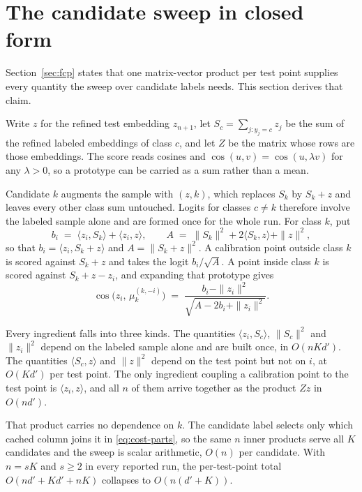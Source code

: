 \section{The candidate sweep in closed form}
\label{app:cost}

Section~\ref{sec:fcp} states that one matrix-vector product per test
point supplies every quantity the sweep over candidate labels needs.
This section derives that claim.

Write $z$ for the refined test embedding $z_{n+1}$, let
$S_c = \sum_{j : y_j = c} z_j$ be the sum of the refined labeled
embeddings of class $c$, and let $Z$ be the matrix whose rows are those
embeddings. The score reads cosines and
$\cos(u, v) = \cos(u, \lambda v)$ for any $\lambda > 0$, so a prototype
can be carried as a sum rather than a mean.

Candidate $k$ augments the sample with $(z, k)$, which replaces $S_k$ by
$S_k + z$ and leaves every other class sum untouched. Logits for classes
$c \neq k$ therefore involve the labeled sample alone and are formed
once for the whole run. For class $k$, put
\begin{equation}
\label{eq:cost-parts}
b_i \;=\; \langle z_i, S_k\rangle + \langle z_i, z\rangle ,
\qquad
A \;=\; \|S_k\|^{2} + 2\langle S_k, z\rangle + \|z\|^{2} ,
\end{equation}
so that $b_i = \langle z_i, S_k + z\rangle$ and $A = \|S_k + z\|^{2}$.
A calibration point outside class $k$ is scored against $S_k + z$ and
takes the logit $b_i / \sqrt{A}$. A point inside class $k$ is scored
against $S_k + z - z_i$, and expanding that prototype gives
\begin{equation}
\label{eq:cost-member}
\cos\bigl(z_i,\, \mu^{(k,-i)}_{k}\bigr) \;=\;
\frac{b_i - \|z_i\|^{2}}
     {\sqrt{A - 2 b_i + \|z_i\|^{2}}} .
\end{equation}

Every ingredient falls into three kinds. The quantities
$\langle z_i, S_c\rangle$, $\|S_c\|^{2}$ and $\|z_i\|^{2}$ depend on the
labeled sample alone and are built once, in $O(nKd')$. The quantities
$\langle S_c, z\rangle$ and $\|z\|^{2}$ depend on the test point but not
on $i$, at $O(Kd')$ per test point. The only ingredient coupling a
calibration point to the test point is $\langle z_i, z\rangle$, and all
$n$ of them arrive together as the product $Z z$ in $O(nd')$.

That product carries no dependence on $k$. The candidate label selects
only which cached column joins it in \eqref{eq:cost-parts}, so the same
$n$ inner products serve all $K$ candidates and the sweep is scalar
arithmetic, $O(n)$ per candidate. With $n = sK$ and $s \ge 2$ in every
reported run, the per-test-point total $O(nd' + Kd' + nK)$ collapses to
$O(n(d' + K))$.

